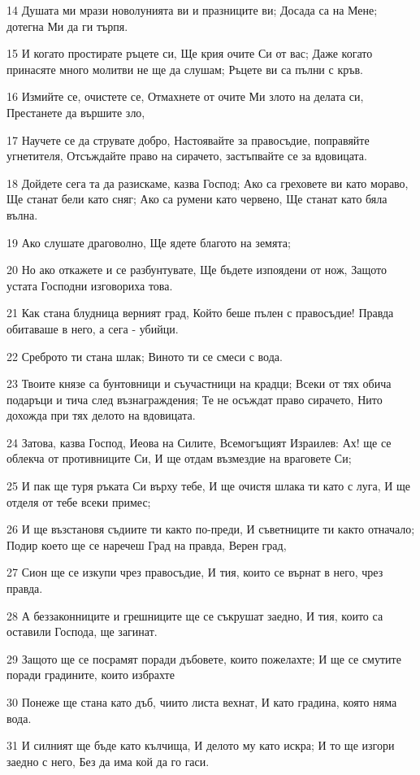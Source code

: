 \par 14 Душата ми мрази новолунията ви и празниците ви; Досада са на Мене; дотегна Ми да ги търпя.
\par 15 И когато простирате ръцете си, Ще крия очите Си от вас; Даже когато принасяте много молитви не ще да слушам; Ръцете ви са пълни с кръв.
\par 16 Измийте се, очистете се, Отмахнете от очите Ми злото на делата си, Престанете да вършите зло,
\par 17 Научете се да струвате добро, Настоявайте за правосъдие, поправяйте угнетителя, Отсъждайте право на сирачето, застъпвайте се за вдовицата.
\par 18 Дойдете сега та да разискаме, казва Господ; Ако са греховете ви като мораво, Ще станат бели като сняг; Ако са румени като червено, Ще станат като бяла вълна.
\par 19 Ако слушате драговолно, Ще ядете благото на земята;
\par 20 Но ако откажете и се разбунтувате, Ще бъдете изпоядени от нож, Защото устата Господни изговориха това.
\par 21 Как стана блудница верният град, Който беше пълен с правосъдие! Правда обитаваше в него, а сега - убийци.
\par 22 Среброто ти стана шлак; Виното ти се смеси с вода.
\par 23 Твоите князе са бунтовници и съучастници на крадци; Всеки от тях обича подаръци и тича след възнаграждения; Те не осъждат право сирачето, Нито дохожда при тях делото на вдовицата.
\par 24 Затова, казва Господ, Иеова на Силите, Всемогъщият Израилев: Ах! ще се облекча от противниците Си, И ще отдам възмездие на враговете Си;
\par 25 И пак ще туря ръката Си върху тебе, И ще очистя шлака ти като с луга, И ще отделя от тебе всеки примес;
\par 26 И ще възстановя съдиите ти както по-преди, И съветниците ти както отначало; Подир което ще се наречеш Град на правда, Верен град,
\par 27 Сион ще се изкупи чрез правосъдие, И тия, които се върнат в него, чрез правда.
\par 28 А беззаконниците и грешниците ще се съкрушат заедно, И тия, които са оставили Господа, ще загинат.
\par 29 Защото ще се посрамят поради дъбовете, които пожелахте; И ще се смутите поради градините, които избрахте
\par 30 Понеже ще стана като дъб, чиито листа вехнат, И като градина, която няма вода.
\par 31 И силният ще бъде като кълчища, И делото му като искра; И то ще изгори заедно с него, Без да има кой да го гаси.


